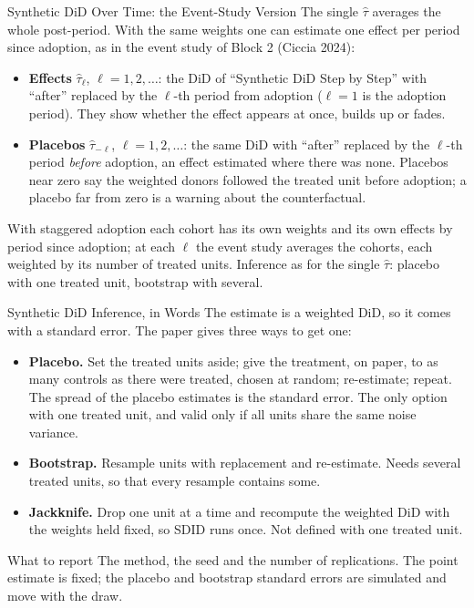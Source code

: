 \documentclass[main.tex]{subfiles}
\begin{document}
\begin{frame}{Synthetic DiD Over Time: the Event-Study Version}
  \small
  The single $\hat\tau$ averages the whole post-period. With the same weights
  one can estimate one effect per period since adoption, as in the event
  study of Block 2 (Ciccia 2024):
  \begin{itemize}\small
    \item \textbf{Effects} $\hat\tau_\ell$, $\ell = 1, 2, \dots$: the DiD of
      ``Synthetic DiD Step by Step'' with ``after'' replaced by the $\ell$-th
      period from adoption ($\ell = 1$ is the adoption period). They show whether the effect appears at once,
      builds up or fades.
    \item \textbf{Placebos} $\hat\tau_{-\ell}$, $\ell = 1, 2, \dots$: the same
      DiD with ``after'' replaced by the $\ell$-th period \emph{before}
      adoption, an effect estimated where there was none. Placebos near zero
      say the weighted donors followed the treated unit before adoption; a
      placebo far from zero is a warning about the counterfactual.
  \end{itemize}
  \medskip
  With staggered adoption each cohort has its own weights and its own effects
  by period since adoption; at each $\ell$ the event study averages the
  cohorts, each weighted by its number of treated units. Inference as for the
  single $\hat\tau$: placebo with one treated unit, bootstrap with several.
\end{frame}

\begin{frame}{Synthetic DiD Inference, in Words}
  \small
  The estimate is a weighted DiD, so it comes with a standard error. The
  paper gives three ways to get one:
  \begin{itemize}\small
    \item \textbf{Placebo.} Set the treated units aside; give the treatment,
      on paper, to as many controls as there were treated, chosen at random;
      re-estimate; repeat. The spread of the placebo estimates is the
      standard error. The only option with one treated unit, and valid only
      if all units share the same noise variance.
    \item \textbf{Bootstrap.} Resample units with replacement and re-estimate.
      Needs several treated units, so that every resample contains some.
    \item \textbf{Jackknife.} Drop one unit at a time and recompute the
      weighted DiD with the weights held fixed, so SDID runs once. Not
      defined with one treated unit.
  \end{itemize}
  \medskip
  \begin{block}{\footnotesize What to report}
    \footnotesize The method, the seed and the number of replications. The
    point estimate is fixed; the placebo and bootstrap standard errors are
    simulated and move with the draw.
  \end{block}
\end{frame}
\end{document}

